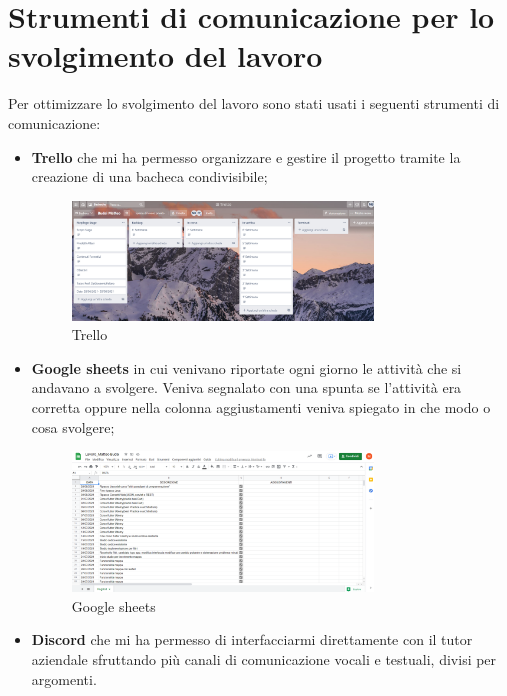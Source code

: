 \section{Strumenti di comunicazione per lo svolgimento del lavoro}
Per ottimizzare lo svolgimento del lavoro sono stati usati i seguenti strumenti di comunicazione:
\begin{itemize}
	\item \textbf{Trello} che mi ha permesso organizzare e gestire il progetto tramite la creazione di una bacheca condivisibile;
	\begin{figure}[htbp]	
		\centering
		\includegraphics[width=8cm]{immagini/trello.png}
		\caption{Trello}
		\label{fig:Trello}
	\end{figure}
	\item \textbf{Google sheets} in cui venivano riportate ogni giorno le attività che si andavano a svolgere. Veniva segnalato con una spunta se l'attività era corretta oppure nella colonna aggiustamenti veniva spiegato in che modo o cosa svolgere;
	\begin{figure}[htbp]	
		\centering
		\includegraphics[width=8cm]{immagini/googlesheet.png}
		\caption{Google sheets}
		\label{fig:Google sheets}
	\end{figure}
	\item \textbf{Discord} che mi ha permesso di interfacciarmi direttamente
	con il tutor aziendale sfruttando più canali di comunicazione vocali e testuali, divisi per argomenti.
\end{itemize}
	


